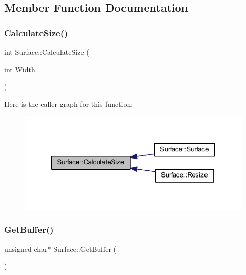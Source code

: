\subsection{Member Function Documentation}
\mbox{\label{class_surface_aeb8a8540f415a4d29c440667e8532e91}} 
\subsubsection{\texorpdfstring{Calculate\+Size()}{CalculateSize()}}
{\footnotesize\ttfamily int Surface\+::\+Calculate\+Size (\begin{DoxyParamCaption}\item[{int}]{Width }\end{DoxyParamCaption})}

Here is the caller graph for this function\+:\nopagebreak
\begin{figure}[H]
\begin{center}
\leavevmode
\includegraphics[width=321pt]{class_surface_aeb8a8540f415a4d29c440667e8532e91_icgraph}
\end{center}
\end{figure}
\mbox{\label{class_surface_a8f8da8f3ee82b8e657916f40b3f40eff}} 
\subsubsection{\texorpdfstring{Get\+Buffer()}{GetBuffer()}}
{\footnotesize\ttfamily unsigned char$\ast$ Surface\+::\+Get\+Buffer (\begin{DoxyParamCaption}{ }\end{DoxyParamCaption})\hspace{0.3cm}{\ttfamily [inline]}}


